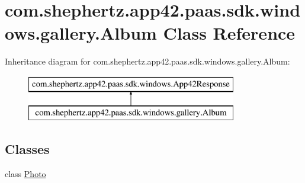 \hypertarget{classcom_1_1shephertz_1_1app42_1_1paas_1_1sdk_1_1windows_1_1gallery_1_1_album}{\section{com.\+shephertz.\+app42.\+paas.\+sdk.\+windows.\+gallery.\+Album Class Reference}
\label{classcom_1_1shephertz_1_1app42_1_1paas_1_1sdk_1_1windows_1_1gallery_1_1_album}
}
Inheritance diagram for com.\+shephertz.\+app42.\+paas.\+sdk.\+windows.\+gallery.\+Album\+:\begin{figure}[H]
\begin{center}
\leavevmode
\includegraphics[height=2.000000cm]{classcom_1_1shephertz_1_1app42_1_1paas_1_1sdk_1_1windows_1_1gallery_1_1_album}
\end{center}
\end{figure}
\subsection*{Classes}
\begin{DoxyCompactItemize}
\item 
class \hyperlink{classcom_1_1shephertz_1_1app42_1_1paas_1_1sdk_1_1windows_1_1gallery_1_1_album_1_1_photo}{Photo}
\end{DoxyCompactItemize}
